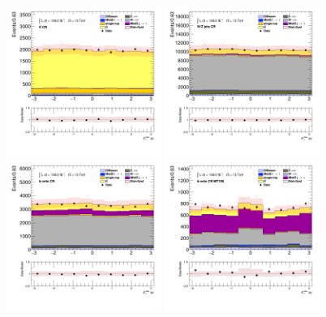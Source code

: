 		\begin{figure}[!htp]
			\begin{center}    
			\includegraphics[width=0.45\textwidth]{chapters/chapter6_HPlus/images/taujets/met_phi_TTBAR.png}
			\includegraphics[width=0.45\textwidth]{chapters/chapter6_HPlus/images/taujets/met_phi_WJETS.png} \\
			\includegraphics[width=0.45\textwidth]{chapters/chapter6_HPlus/images/taujets/met_phi_BVETO.png}
			\includegraphics[width=0.45\textwidth]{chapters/chapter6_HPlus/images/taujets/met_phi_BVETO_MT100.png} \\

\end{center}
\end{figure}

